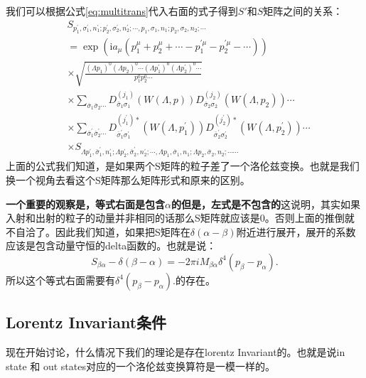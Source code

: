 我们可以根据公式\cref{eq:multitrans}代入右面的式子得到$S'$和$S$矩阵之间的关系：
\begin{align}
  &S_{p_1^{\prime},\sigma_1^{\prime},n_1^{\prime};p_2^{\prime},\sigma_2^{\prime},n_2^{\prime};\cdots,p_1,\sigma_1,n_1;p_2,\sigma_2,n_2;\cdots}\\
&=\exp\left(\mathrm{i}a_\mu(p_1^\mu+p_2^\mu+\cdots-p_1^{\prime\mu}-p_2^{\prime\mu}-\cdots)\right)\\
&\times\sqrt{\frac{(\Lambda p_1)^0(\Lambda p_2)^0\cdots(\Lambda p_1^{\prime})^0(\Lambda p_2^{\prime})^0\cdots}{p_1^0p_2^0\cdots}}\\
&\times\sum_{\bar{\sigma}_1\bar{\sigma}_2\cdots}D_{\bar{\sigma}_1\sigma_1}^{(j_1)}\left(W(\Lambda,p)\right)D_{\bar{\sigma}_2\sigma_2}^{(j_2)}\left(W(\Lambda,p_2)\right)\cdots\\
&\times\sum_{\bar{\sigma}_1^{\prime}\bar{\sigma}_2^{\prime}\cdots}D_{\bar{\sigma}_1^{\prime}\sigma_1^{\prime}}^{(j_1^{\prime})*}\left(W(\Lambda,p_1^{\prime})\right)D_{\bar{\sigma}_2^{\prime}\sigma_2^{\prime}}^{(j_2^{\prime})*}\left(W(\Lambda,p_2^{\prime})\right)\cdots\\
&\times S_{\Lambda p_1^{\prime},\bar{\sigma}_1^{\prime},n_1^{\prime};\Lambda p_2^{\prime},\bar{\sigma}_2^{\prime},n_2^{\prime};\cdots,\Lambda p_1,\bar{\sigma}_1,n_1;\Lambda p_2,\bar{\sigma}_2,n_2;\cdots\cdots}
\end{align}
上面的公式我们知道，是如果两个S矩阵的粒子差了一个洛伦兹变换。也就是我们换一个视角去看这个S矩阵那么矩阵形式和原来的区别。

\textbf{一个重要的观察是，等式右面是包含$\alpha$的但是，左式是不包含的}这说明，其实如果入射和出射的粒子的动量并非相同的话那么S矩阵就应该是0。否则上面的推倒就不自洽了。因此我们知道，如果把S矩阵在$\delta(\alpha -\beta)$附近进行展开，展开的系数应该是包含动量守恒的delta函数的。也就是说：
\begin{equation}
  S_{\beta\alpha}-\delta(\beta-\alpha)=-2\pi iM_{\beta\alpha}\delta^4(p_\beta-p_\alpha).
  \label{eq:momentumconservation}
\end{equation}
所以这个等式右面需要有$\delta^4(p_\beta-p_\alpha).$的存在。



\subsection{Lorentz Invariant条件}

现在开始讨论，什么情况下我们的理论是存在lorentz Invariant的。也就是说in state 和 out states对应的一个洛伦兹变换算符是一模一样的。


